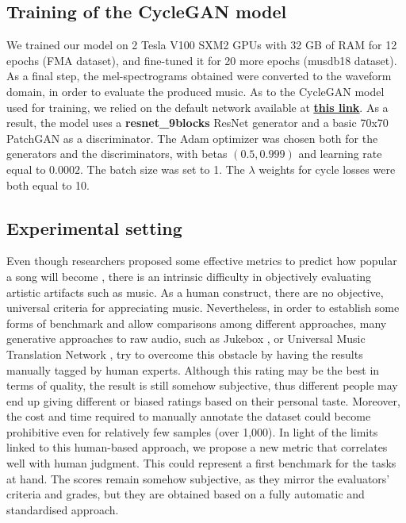 \documentclass[journal]{IEEEtran}
\begin{document}
\subsection{Training of the CycleGAN model}

We trained our model on 2 Tesla V100 SXM2 GPUs with 32 GB of RAM for 12 epochs (FMA dataset), and fine-tuned it for 20 more epochs (musdb18 dataset). As a final step, the mel-spectrograms obtained were converted to the waveform domain, in order to evaluate the produced music. As to the CycleGAN model used for training, we relied on the default network available at \underline{\textbf{\href{https://github.com/junyanz/pytorch-CycleGAN-and-pix2pix}{this link}}}. 
As a result, the model uses a \textbf{resnet\_9blocks} ResNet generator and a basic 70x70 PatchGAN as a discriminator. The Adam optimizer \cite{kingma2014adam}
was chosen both for the generators and the discriminators, with betas $(0.5, 0.999)$ and learning rate equal to $0.0002$. The batch size was set to 1. The $\lambda$ weights for cycle losses were both equal to 10.

\subsection{Experimental setting}

Even though researchers proposed some effective metrics to predict how popular a song will become \cite{8327835}, there is an intrinsic difficulty in objectively evaluating artistic artifacts such as music. As a human construct, there are no objective, universal criteria for appreciating music.  Nevertheless, in order to establish some forms of benchmark and allow comparisons among different approaches, many generative approaches to raw audio, such as Jukebox \cite{dhariwal2020jukebox}, or Universal Music Translation Network \cite{mor2018universal}, try to overcome this obstacle by having the results manually tagged by human experts. Although this rating may be the best in terms of quality, the result is still somehow subjective, thus different people may end up giving different or biased ratings based on their personal taste. Moreover, the 
cost and time required to manually annotate the dataset could become prohibitive even for relatively few samples (over 1,000). In light of the limits linked to this human-based approach, we propose a new metric that %
correlates well with human judgment. This could represent a first benchmark for the tasks at hand. The %
scores remain somehow subjective, 
as they mirror the evaluators' criteria and grades, but they are obtained based on a fully automatic and standardised approach. 
\end{document}
